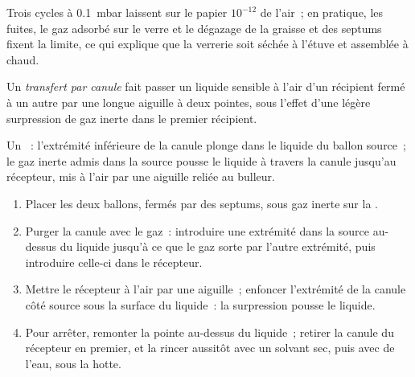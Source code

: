 Trois cycles à \qty{0.1}{mbar} laissent sur le papier $10^{-12}$ de l'air~; en pratique, les fuites, le gaz
adsorbé sur le verre et le dégazage de la graisse et des septums fixent la
limite, ce qui explique que la verrerie soit séchée à l'étuve et assemblée
à chaud.

\begin{definition}\label{def:b3:lab-techniques-3:cannula}
Un \emph{transfert par canule} fait passer un
liquide sensible à l'air d'un récipient fermé à un autre par une longue
aiguille à deux pointes, sous l'effet d'une légère surpression de gaz
inerte dans le premier récipient.
\end{definition}

\begin{omfigure}

{\small Un ~: l'extrémité inférieure de la canule plonge
dans le liquide du ballon source~; le gaz inerte admis dans la source
pousse le liquide à travers la canule jusqu'au récepteur, mis à l'air par
une aiguille reliée au bulleur.}
\end{omfigure}

\begin{method}\label{met:b3:lab-techniques-3:cannula}
\begin{enumerate}
  \item Placer les deux ballons, fermés par des septums, sous gaz inerte
        sur la .
  \item Purger la canule avec le gaz~: introduire une extrémité dans la
        source au-dessus du liquide jusqu'à ce que le gaz sorte par l'autre
        extrémité, puis introduire celle-ci dans le récepteur.
  \item Mettre le récepteur à l'air par une aiguille~; enfoncer
        l'extrémité de la canule côté source sous la surface du liquide~: la
        surpression pousse le liquide.
  \item Pour arrêter, remonter la pointe au-dessus du liquide~; retirer la
        canule du récepteur en premier, et la rincer aussitôt avec un
        solvant sec, puis avec de l'eau, sous la hotte.
\end{enumerate}
\end{method}

